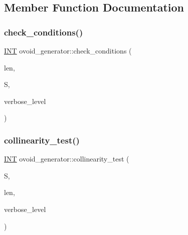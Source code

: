 \subsection{Member Function Documentation}
\mbox{\label{classovoid__generator_a6238427dcb098555e2067902ffde98f9}} 
\subsubsection{\texorpdfstring{check\+\_\+conditions()}{check\_conditions()}}
{\footnotesize\ttfamily \mbox{\hyperlink{galois_8h_a09fddde158a3a20bd2dcadb609de11dc}{I\+NT}} ovoid\+\_\+generator\+::check\+\_\+conditions (\begin{DoxyParamCaption}\item[{\mbox{\hyperlink{galois_8h_a09fddde158a3a20bd2dcadb609de11dc}{I\+NT}}}]{len,  }\item[{\mbox{\hyperlink{galois_8h_a09fddde158a3a20bd2dcadb609de11dc}{I\+NT}} $\ast$}]{S,  }\item[{\mbox{\hyperlink{galois_8h_a09fddde158a3a20bd2dcadb609de11dc}{I\+NT}}}]{verbose\+\_\+level }\end{DoxyParamCaption})}

\mbox{\label{classovoid__generator_ae2779df2b3b46df65bc89b774ed37d9a}} 
\subsubsection{\texorpdfstring{collinearity\+\_\+test()}{collinearity\_test()}}
{\footnotesize\ttfamily \mbox{\hyperlink{galois_8h_a09fddde158a3a20bd2dcadb609de11dc}{I\+NT}} ovoid\+\_\+generator\+::collinearity\+\_\+test (\begin{DoxyParamCaption}\item[{\mbox{\hyperlink{galois_8h_a09fddde158a3a20bd2dcadb609de11dc}{I\+NT}} $\ast$}]{S,  }\item[{\mbox{\hyperlink{galois_8h_a09fddde158a3a20bd2dcadb609de11dc}{I\+NT}}}]{len,  }\item[{\mbox{\hyperlink{galois_8h_a09fddde158a3a20bd2dcadb609de11dc}{I\+NT}}}]{verbose\+\_\+level }\end{DoxyParamCaption})}

